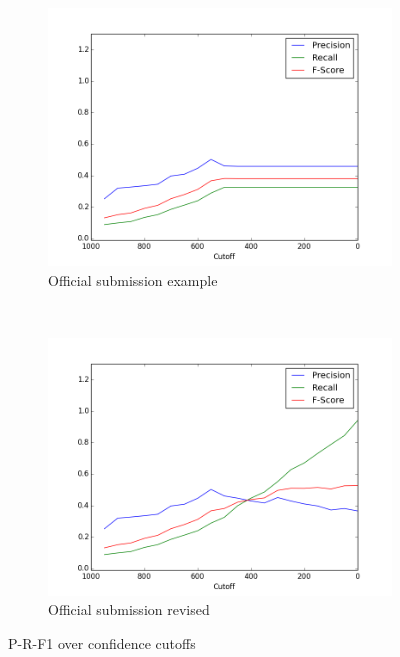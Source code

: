\documentclass{article}
\begin{document}
\def \officialRunWidth {0.23\textwidth}
\begin{figure}[tb]
  \centering
    \begin{subfigure}[b]{\officialRunWidth}
            \includegraphics[width=\textwidth]{fig/clust_dyn_wrong.png}
      \caption{Official submission example}
      \label{official:submission}
    \end{subfigure}
    ~
    \begin{subfigure}[b]{\officialRunWidth}
            \includegraphics[width=\textwidth]{fig/clust_dyn_right.png}
      \caption{Official submission revised}
      \label{official:revised}
    \end{subfigure}
\caption{P-R-F1 over confidence cutoffs}
\label{submissionAndRevised}
\end{figure}
\end{document}
